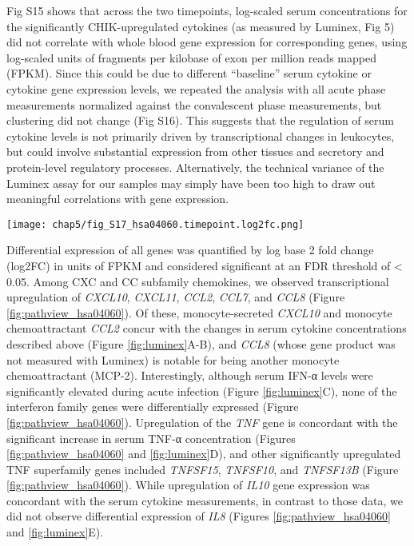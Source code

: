 Fig S15 shows that across the two timepoints, log-scaled serum concentrations for the significantly CHIK-upregulated cytokines (as measured by Luminex, Fig 5) did not correlate with whole blood gene expression for corresponding genes, using log-scaled units of fragments per kilobase of exon per million reads mapped (FPKM). Since this could be due to different “baseline” serum cytokine or cytokine gene expression levels, we repeated the analysis with all acute phase measurements normalized against the convalescent phase measurements, but clustering did not change (Fig S16). This suggests that the regulation of serum cytokine levels is not primarily driven by transcriptional changes in leukocytes, but could involve substantial expression from other tissues and secretory and protein-level regulatory processes. Alternatively, the technical variance of the Luminex assay for our samples may simply have been too high to draw out meaningful correlations with gene expression. 

\begin{figure*}[hp]
  \centering
  \texttt{[image: chap5/fig\_S17\_hsa04060.timepoint.log2fc.png]}
\end{figure*}

Differential expression of all genes was quantified by log base 2 fold change (log2FC) in units of FPKM and considered significant at an FDR threshold of < 0.05. Among CXC and CC subfamily chemokines, we observed transcriptional upregulation of \emph{CXCL10}, \emph{CXCL11}, \emph{CCL2}, \emph{CCL7}, and \emph{CCL8} (Figure \ref{fig:pathview_hsa04060}). Of these, monocyte-secreted \emph{CXCL10} and monocyte chemoattractant \emph{CCL2} concur with the changes in serum cytokine concentrations described above (Figure \ref{fig:luminex}A-B), and \emph{CCL8} (whose gene product was not measured with Luminex) is notable for being another monocyte chemoattractant (MCP-2). Interestingly, although serum IFN-α levels were significantly elevated during acute infection (Figure \ref{fig:luminex}C), none of the interferon family genes were differentially expressed (Figure \ref{fig:pathview_hsa04060}). Upregulation of the \emph{TNF} gene is concordant with the significant increase in serum TNF-α concentration (Figures \ref{fig:pathview_hsa04060} and \ref{fig:luminex}D), and other significantly upregulated TNF superfamily genes included \emph{TNFSF15}, \emph{TNFSF10}, and \emph{TNFSF13B} (Figure \ref{fig:pathview_hsa04060}). While upregulation of \emph{IL10} gene expression was concordant with the serum cytokine measurements, in contrast to those data, we did not observe differential expression of \emph{IL8} (Figures \ref{fig:pathview_hsa04060} and \ref{fig:luminex}E). 

